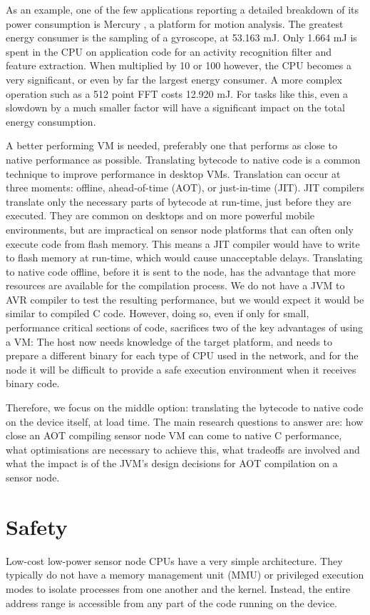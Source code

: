 As an example, one of the few applications reporting a detailed breakdown of its power consumption is Mercury \cite{Lorincz:2009kt}, a platform for motion analysis. The greatest energy consumer is the sampling of a gyroscope, at 53.163 mJ. Only 1.664 mJ is spent in the CPU on application code for an activity recognition filter and feature extraction. When multiplied by 10 or 100 however, the CPU becomes a very significant, or even by far the largest energy consumer. A more complex operation such as a 512 point FFT costs 12.920 mJ. For tasks like this, even a slowdown by a much smaller factor will have a significant impact on the total energy consumption.

A better performing VM is needed, preferably one that performs as close to native performance as possible. Translating bytecode to native code is a common technique to improve performance in desktop VMs. Translation can occur at three moments: offline, ahead-of-time (AOT), or just-in-time (JIT). JIT compilers translate only the necessary parts of bytecode at run-time, just before they are executed. They are common on desktops and on more powerful mobile environments, but are impractical on sensor node platforms that can often only execute code from flash memory. This means a JIT compiler would have to write to flash memory at run-time, which would cause unacceptable delays. Translating to native code offline, before it is sent to the node, has the advantage that more resources are available for the compilation process. We do not have a JVM to AVR compiler to test the resulting performance, but we would expect it would be similar to compiled C code. However, doing so, even if only for small, performance critical sections of code, sacrifices two of the key advantages of using a VM: The host now needs knowledge of the target platform, and needs to prepare a different binary for each type of CPU used in the network, and for the node it will be difficult to provide a safe execution environment when it receives binary code.

Therefore, we focus on the middle option: translating the bytecode to native code on the device itself, at load time. The main research questions to answer are: how close an AOT compiling sensor node VM can come to native C performance, what optimisations are necessary to achieve this, what tradeoffs are involved and what the impact is of the JVM's design decisions for AOT compilation on a sensor node.

\section{Safety}
Low-cost low-power sensor node CPUs have a very simple architecture. They typically do not have a memory management unit (MMU) or privileged execution modes to isolate processes from one another and the kernel. Instead, the entire address range is accessible from any part of the code running on the device.

